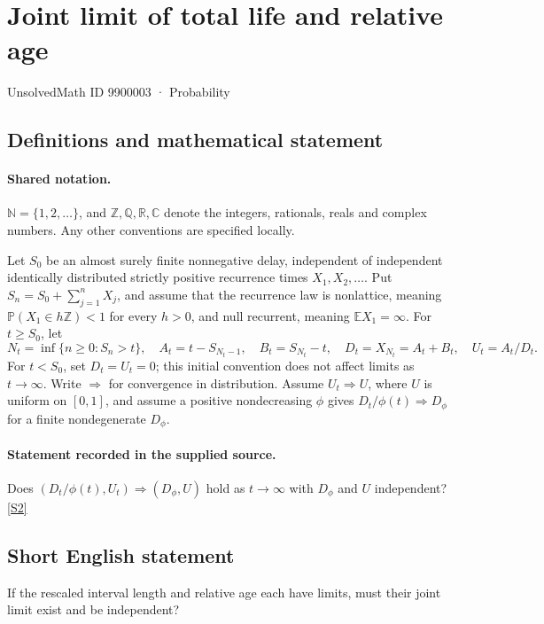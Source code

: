 \documentclass[11pt]{article}
\newcommand{\sref}[2]{\hyperlink{source:#1:#2}{[S#2]}}
\begin{document}
\setcounter{section}{9900002}
\section{Joint limit of total life and relative age}\label{9900003}
{\small\sffamily UnsolvedMath ID 9900003 · Probability}
\subsection{Definitions and mathematical statement}

\paragraph{Shared notation.}$\mathbb N=\{1,2,\ldots\}$, and $\mathbb Z,\mathbb Q,\mathbb R,\mathbb C$ denote the integers, rationals, reals and complex numbers. Any other conventions are specified locally.


Let $S_0$ be an almost surely finite nonnegative delay, independent of independent identically distributed strictly positive recurrence times $X_1,X_2,\ldots$. Put $S_n=S_0+\sum_{j=1}^nX_j$, and assume that the recurrence law is nonlattice, meaning $\mathbb P(X_1\in h\mathbb Z)<1$ for every $h>0$, and null recurrent, meaning $\mathbb E X_1=\infty$. For $t\ge S_0$, let
\[N_t=\inf\{n\ge0:S_n>t\},\quad A_t=t-S_{N_t-1},\quad B_t=S_{N_t}-t,\quad D_t=X_{N_t}=A_t+B_t,\quad U_t=A_t/D_t.\]
For $t<S_0$, set $D_t=U_t=0$; this initial convention does not affect limits as $t\to\infty$. Write $\Rightarrow$ for convergence in distribution. Assume $U_t\Rightarrow U$, where $U$ is uniform on $[0,1]$, and assume a positive nondecreasing $\phi$ gives $D_t/\phi(t)\Rightarrow D_\phi$ for a finite nondegenerate $D_\phi$.
\paragraph{Statement recorded in the supplied source.}
Does $(D_t/\phi(t),U_t)\Rightarrow(D_\phi,U)$ hold as $t\to\infty$ with $D_\phi$ and $U$ independent? \sref{9900003}{2}
\subsection{Short English statement}
If the rescaled interval length and relative age each have limits, must their joint limit exist and be independent?
\end{document}
